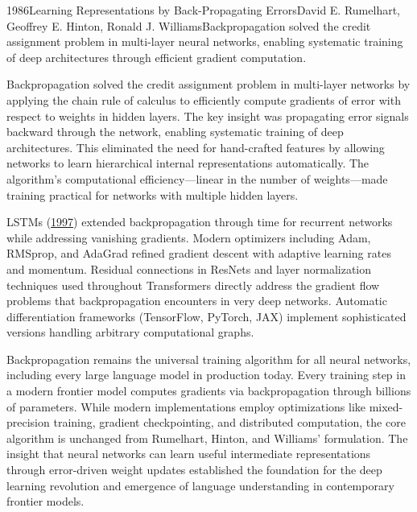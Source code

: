 
\begin{papersummary}{1986}{Learning Representations by Back-Propagating Errors}{David E. Rumelhart, Geoffrey E. Hinton, Ronald J. Williams}{Backpropagation solved the credit assignment problem in multi-layer neural networks, enabling systematic training of deep architectures through efficient gradient computation.}

Backpropagation solved the credit assignment problem in multi-layer networks by applying the chain rule of calculus to efficiently compute gradients of error with respect to weights in hidden layers. The key insight was propagating error signals backward through the network, enabling systematic training of deep architectures. This eliminated the need for hand-crafted features by allowing networks to learn hierarchical internal representations automatically. The algorithm's computational efficiency—linear in the number of weights—made training practical for networks with multiple hidden layers.

LSTMs (\hyperref[paper:hochreiter-schmidhuber-1997]{1997}) extended backpropagation through time for recurrent networks while addressing vanishing gradients. Modern optimizers including Adam, RMSprop, and AdaGrad refined gradient descent with adaptive learning rates and momentum. Residual connections in ResNets and layer normalization techniques used throughout Transformers directly address the gradient flow problems that backpropagation encounters in very deep networks. Automatic differentiation frameworks (TensorFlow, PyTorch, JAX) implement sophisticated versions handling arbitrary computational graphs.

Backpropagation remains the universal training algorithm for all neural networks, including every large language model in production today. Every training step in a modern frontier model computes gradients via backpropagation through billions of parameters. While modern implementations employ optimizations like mixed-precision training, gradient checkpointing, and distributed computation, the core algorithm is unchanged from Rumelhart, Hinton, and Williams' formulation. The insight that neural networks can learn useful intermediate representations through error-driven weight updates established the foundation for the deep learning revolution and emergence of language understanding in contemporary frontier models.

\end{papersummary}
